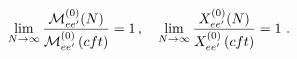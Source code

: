 \begin{equation}
\lim_{N\rightarrow \infty }\frac{\mathcal{M}_{ee^{\prime }}^{(0)}(N)}{%
\mathcal{M}_{ee^{\prime }}^{(0)}\left( cft\right) }=1\,,\quad
\lim_{N\rightarrow \infty }\frac{X_{ee^{\prime }}^{(0)}(N)}{X_{ee^{\prime
}}^{(0)}\left( cft\right) }=1\,\,.
\end{equation}

